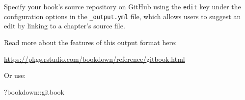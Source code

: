 \documentclass[
]{book}
\newenvironment{Shaded}{\begin{snugshade}}{\end{snugshade}}
\newcommand{\NormalTok}[1]{#1}
\newcommand{\SpecialCharTok}[1]{\textcolor[rgb]{0.00,0.00,0.00}{#1}}
\begin{document}
Specify your book's source repository on GitHub using the \texttt{edit} key under the configuration options in the \texttt{\_output.yml} file, which allows users to suggest an edit by linking to a chapter's source file.

Read more about the features of this output format here:

\url{https://pkgs.rstudio.com/bookdown/reference/gitbook.html}

Or use:

\begin{Shaded}
\begin{Highlighting}[]
\NormalTok{?bookdown}\SpecialCharTok{::}\NormalTok{gitbook}
\end{Highlighting}
\end{Shaded}


  
\end{document}
